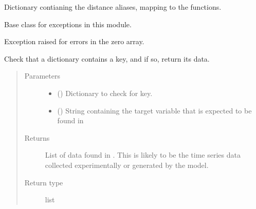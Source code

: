 \documentclass[letterpaper,10pt,english]{sphinxmanual}
\begin{document}
\begin{fulllineitems}
\label{\detokenize{abc:bayescmd.abc.distances.DISTANCES}}
 \textendash{} Dictionary contianing the distance aliases, mapping to the functions.

\end{fulllineitems}


\begin{fulllineitems}
\label{\detokenize{abc:bayescmd.abc.distances.Error}}
Base class for exceptions in this module.

\end{fulllineitems}


\begin{fulllineitems}
\label{\detokenize{abc:bayescmd.abc.distances.ZeroArrayError}}
Exception raised for errors in the zero array.

\end{fulllineitems}


\begin{fulllineitems}
\label{\detokenize{abc:bayescmd.abc.distances.check_for_key}}
Check that a dictionary contains a key, and if so, return its data.
\begin{quote}\begin{description}
\item[{Parameters}] \leavevmode\begin{itemize}
\item {} 
 () \textendash{} Dictionary to check for  key.

\item {} 
 () \textendash{} String containing the target variable that is expected to be found in

\end{itemize}

\item[{Returns}] \leavevmode
{} \textendash{} List of data found in . This is likely to be the time
series data collected experimentally or generated by the model.

\item[{Return type}] \leavevmode
list

\end{description}\end{quote}

\end{fulllineitems}
\end{document}
